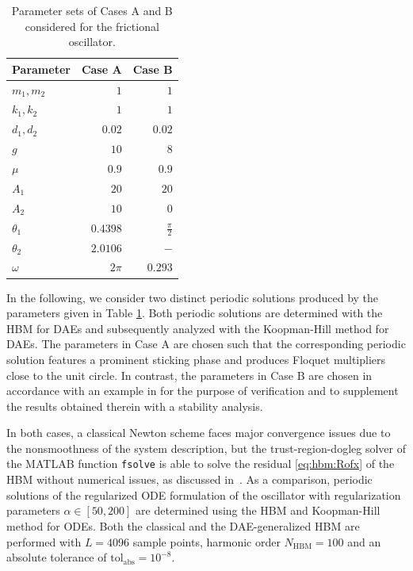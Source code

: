 \documentclass[a4paper, nonatbib, 3p, twocolumn]{elsarticle}
\theoremstyle{plain}
\theoremstyle{definition}
\theoremstyle{remark}
\begin{document}
\begin{table}[hbt]
    \centering
    \caption{Parameter sets of Cases A and B considered for the frictional oscillator.}
    \begin{tabular}{lrr}
         \toprule
         Parameter & Case A & Case B \\ 
         \midrule
         $m_1, m_2$ &  $1$ & $1$\\
         $k_1, k_2$ &  $1$ & $1$\\
         $d_1, d_2$ &  $0.02$ & $0.02$\\
         $g$ &  $10$ & $8$\\
         $\mu$ &  $0.9$ & $0.9$\\
         $A_1$ &  $20$ & $20$\\
         $A_2$ &  $10$ & $0$\\
         $\theta_1$ &  $0.4398$ & $\frac{\pi}{2}$\\
         $\theta_2$ &  $2.0106$ & $-$\\
         $\omega$ &  $2\pi$ & $0.293$\\
         \bottomrule         
    \end{tabular}
    \label{tab:Examples:ParametersOscillator}
\end{table}

In the following, we consider two distinct periodic solutions produced by the parameters given in Table \ref{tab:Examples:ParametersOscillator}. Both periodic solutions are determined with the HBM for DAEs and subsequently analyzed with the Koopman-Hill method for DAEs. The parameters in Case A are chosen such that the corresponding periodic solution features a prominent sticking phase and produces Floquet multipliers close to the unit circle. In contrast, the parameters in Case B are chosen in accordance with an example in \cite{Legrand2024} for the purpose of verification and to supplement the results obtained therein with a stability analysis.

In both cases, a classical Newton scheme faces major convergence issues due to the nonsmoothness of the system description, but the trust-region-dogleg solver of the MATLAB function \texttt{fsolve} is able to solve the residual \eqref{eq:hbm:Rofx} of the HBM without numerical issues, as discussed in~\cite{Legrand2024}.
 As a comparison, periodic solutions of the regularized ODE formulation of the oscillator with regularization parameters $\alpha \in [50, 200]$ are determined using the HBM and Koopman-Hill method for ODEs.
Both the classical and the DAE-generalized HBM are performed with $L=4096$ sample points, harmonic order $N_\mathrm{HBM}=100$ and an absolute tolerance of  $\mathrm{tol}_\mathrm{abs}=10^{-8}$.
\end{document}
